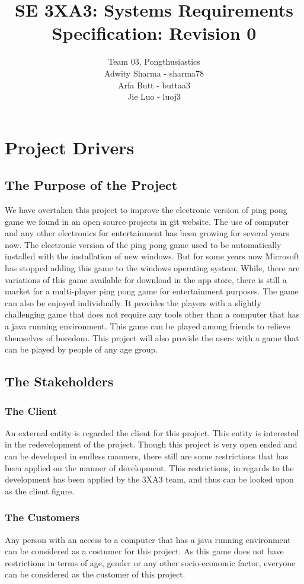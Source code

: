 \documentclass[12pt,letterpaper]{article}
\title{SE 3XA3: Systems Requirements Specification: Revision 0}
\author{Team 03, Pongthusiastics 		
\\ Adwity Sharma - sharma78 		
\\ Arfa Butt - buttaa3 	
	\\ Jie Luo - luoj3 }
\date{}
\begin{document}
\maketitle
\newpage
\tableofcontents
\newpage
	
	\section{Project Drivers}
	\subsection{The Purpose of the Project}
	We have overtaken this project to improve the electronic version of ping pong game we found in an open source projects in git website. The use of computer and any other electronics for entertainment has been growing for several years now. The electronic version of the ping pong game used to be automatically installed with the installation of new windows. But for some years now Microsoft has stopped adding this game to the windows operating system. While, there are variations of this game available for download in the app store, there is still a market for a multi-player ping pong game for entertainment purposes. The game can also be enjoyed individually. It provides the players with a slightly challenging game that does not require any tools other than a computer that has a java running environment. This game can be played among friends to relieve themselves of boredom. This project will also provide the users with a game that can be played by people of any age group. 
	
	\subsection{The Stakeholders}
	\subsubsection{The Client}
	An external entity is regarded the client for this project. This entity is interested in the redevelopment of the project. Though this project is very open ended and can be developed in endless manners, there still are some restrictions that has been applied on the manner of development. This restrictions, in regards to the development has been applied by the 3XA3 team, and thus can be looked upon as the client figure.			
	\subsubsection{The Customers}
	Any person with an access to a computer that has a java running environment can be considered as a costumer for this project. As this game does not have restrictions in terms of age, gender or any other socio-economic factor, everyone can be considered as the customer of this project.
\end{document}
